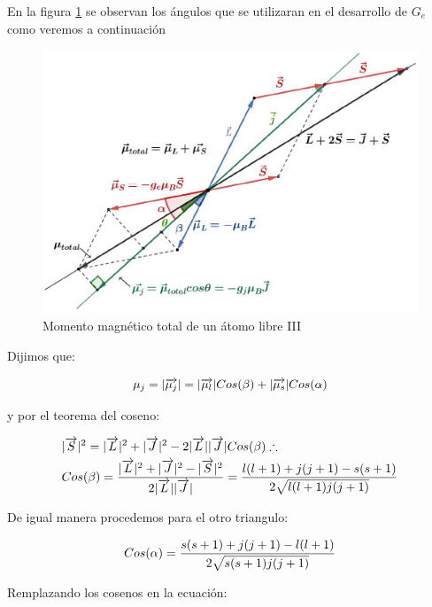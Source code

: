 En la figura \ref{fig:119} se observan los ángulos que se utilizaran en el desarrollo de $G_{e}$ como veremos a continuación

\begin{figure}[H]
    \centering
    \includegraphics[width=1.0\textwidth]{./Figures/fig119}
	\caption{Momento magnético total de un átomo libre III}
	\label{fig:119}
 \end{figure}
 
Dijimos que:
 
\begin{equation*}
	\mu_{j}=\vert \overrightarrow{\mu_{j}} \vert=\vert \overrightarrow{\mu_{l}} \vert Cos(\beta)+\vert \overrightarrow{\mu_{s}} \vert Cos(\alpha)
\end{equation*} 

y por el teorema del coseno:

\begin{equation*}
	\begin{aligned}[c]
	&\vert \overrightarrow{S} \vert^{2}=\vert \overrightarrow{L} \vert^{2}+\vert \overrightarrow{J} \vert^{2}-2\vert \overrightarrow{L} \vert\vert \overrightarrow{J} \vert Cos(\beta)\therefore \\
	&Cos(\beta)=\dfrac{\vert \overrightarrow{L} \vert^{2}+\vert \overrightarrow{J} \vert^{2}-\vert \overrightarrow{S} \vert^{2}}{2\vert \overrightarrow{L} \vert\vert \overrightarrow{J} \vert}= \dfrac{l(l + 1)+j(j + 1)-s(s + 1)}{2\sqrt{l(l + 1)j(j + 1)}}
	\end{aligned}
\end{equation*} 

De igual manera procedemos para el otro triangulo:

\begin{equation*}
Cos(\alpha)= \dfrac{s(s + 1)+j(j + 1)-l(l + 1)}{2\sqrt{s(s + 1)j(j + 1)}}
\end{equation*} 

Remplazando los cosenos en la ecuación:

